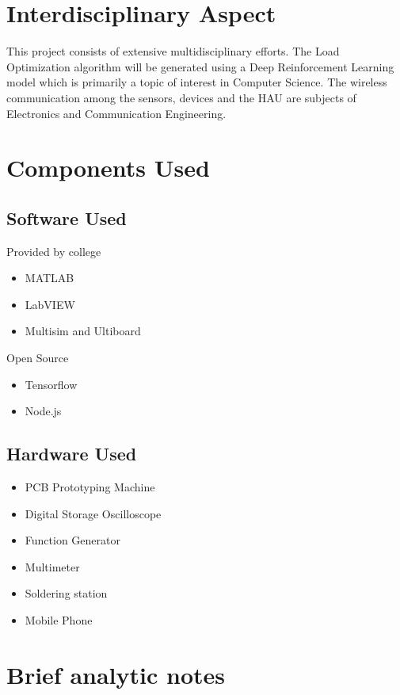         \section{Interdisciplinary Aspect}
        	This project consists of extensive multidisciplinary efforts.
        	The Load Optimization algorithm will be generated using a Deep Reinforcement Learning model which is primarily a topic of interest in Computer Science.
        	The wireless communication among the sensors, devices and the HAU are subjects of Electronics and Communication Engineering.\\
        \section{Components Used}
	        \subsection{Software Used}	
	        Provided by college
	        \begin{itemize}
	        	\item MATLAB
	        	\item LabVIEW
	        	\item Multisim and Ultiboard
	        \end{itemize}
	        Open Source
	        \begin{itemize}
	        	\item Tensorflow
	        	\item Node.js
	        \end{itemize}
	        \subsection{Hardware Used}
	        \begin{itemize}
	        	\item PCB Prototyping Machine
	        	\item Digital Storage Oscilloscope
	        	\item Function Generator
	        	\item Multimeter
	        	\item Soldering station
	        	\item Mobile Phone
	        \end{itemize}
        \section{Brief analytic notes}
